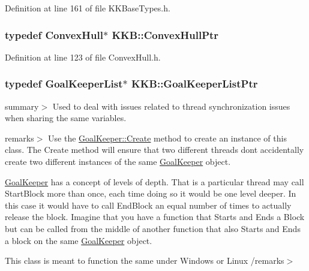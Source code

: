Definition at line 161 of file K\+K\+Base\+Types.\+h.

\subsubsection[{\texorpdfstring{Convex\+Hull\+Ptr}{ConvexHullPtr}}]{\setlength{\rightskip}{0pt plus 5cm}typedef {\bf Convex\+Hull}$\ast$ {\bf K\+K\+B\+::\+Convex\+Hull\+Ptr}}\hypertarget{namespace_k_k_b_a2cd041adc87da43384dfd9d283df8676}{}\label{namespace_k_k_b_a2cd041adc87da43384dfd9d283df8676}


Definition at line 123 of file Convex\+Hull.\+h.

\subsubsection[{\texorpdfstring{Goal\+Keeper\+List\+Ptr}{GoalKeeperListPtr}}]{\setlength{\rightskip}{0pt plus 5cm}typedef {\bf Goal\+Keeper\+List}$\ast$ {\bf K\+K\+B\+::\+Goal\+Keeper\+List\+Ptr}}\hypertarget{namespace_k_k_b_a0b1032cb0aabc82f3f39875869101414}{}\label{namespace_k_k_b_a0b1032cb0aabc82f3f39875869101414}
summary$>$ Used to deal with issues related to thread synchronization issues when sharing the same variables. 

remarks$>$ Use the \hyperlink{class_k_k_b_1_1_goal_keeper_a46f564dd14177c3e6c413a2853e8de2b}{Goal\+Keeper\+::\+Create} method to create an instance of this class. The Create method will ensure that two different threads don\textquotesingle{}t accidentally create two different instances of the same \hyperlink{class_k_k_b_1_1_goal_keeper}{Goal\+Keeper} object.

\hyperlink{class_k_k_b_1_1_goal_keeper}{Goal\+Keeper} has a concept of levels of depth. That is a particular thread may call Start\+Block more than once, each time doing so it would be one level deeper. In this case it would have to call End\+Block an equal number of times to actually release the block. Imagine that you have a function that Starts and Ends a Block but can be called from the middle of another function that also Starts and Ends a block on the same \hyperlink{class_k_k_b_1_1_goal_keeper}{Goal\+Keeper} object.

This class is meant to function the same under Windows or Linux /remarks$>$ 

